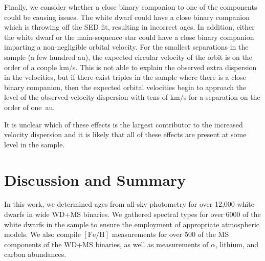 \documentclass[twocolumn,linenumbers]{aastex631}
\begin{document}

Finally, we consider whether a close binary companion to one of the components could be causing issues. The white dwarf could have a close binary companion which is throwing off the SED fit, resulting in incorrect ages. In addition, either the white dwarf or the main-sequence star could have a close binary companion imparting a non-negligible orbital velocity. For the smallest separations in the sample (a few hundred au), the expected circular velocity of the orbit is on the order of a couple km/s. This is not able to explain the observed extra dispersion in the velocities, but if there exist triples in the sample where there is a close binary companion, then the expected orbital velocities begin to approach the level of the observed velocity dispersion with tens of km/s for a separation on the order of one~au.  

It is unclear which of these effects is the largest contributor to the increased velocity dispersion and it is likely that all of these effects are present at some level in the sample.

\section{Discussion and Summary}\label{sec:chap4_conclude}

In this work, we determined ages from all-sky photometry for over 12,000 white dwarfs in wide WD+MS binaries. We gathered spectral types for over 6000 of the white dwarfs in the sample to ensure the employment of appropriate atmospheric models. We also compile $\left[\mathrm{Fe/H}\right]$ measurements for over 500 of the MS components of the WD+MS binaries, as well as measurements of $\alpha$, lithium, and carbon abundances.
\end{document}
